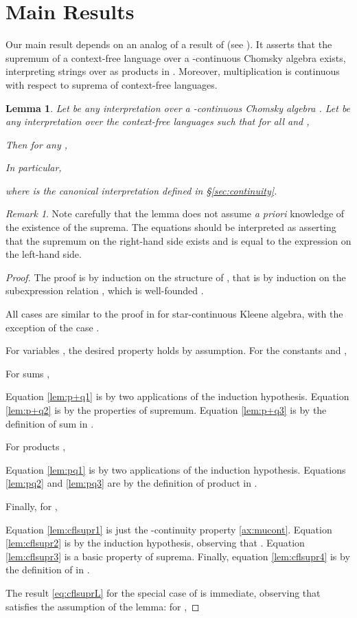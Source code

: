 \documentclass[copyright,creativecommons]{eptcs}
\newtheorem{lemma}[theorem]{Lemma}
\theoremstyle{remark}
\newtheorem{remark}{Remark}
\begin{document}
\section{Main Results}
\label{sec:main}

Our main result depends on an analog of a result of \cite{kozen81} (see \cite{K91a}). It asserts that the supremum of a context-free language over a -continuous Chomsky algebra  exists, interpreting strings over  as products in . Moreover, multiplication is continuous with respect to suprema of context-free languages.


\begin{lemma}
\label{lem:cflsupr}
Let  be any interpretation over a -continuous Chomsky algebra .
Let  be any interpretation over the context-free languages  such that for all  and ,

Then for any ,

In particular,

where  is the canonical interpretation defined in \S\ref{sec:continuity}.
\end{lemma}
\begin{remark}
Note carefully that the lemma does not assume \emph{a priori} knowledge of the existence of the suprema. The equations should be interpreted as asserting that the supremum on the right-hand side exists and is equal to the expression on the left-hand side.
\end{remark}
\begin{proof}
The proof is by induction on the structure of , that is by
induction on the subexpression relation , which is 
well-founded \cite{kozen83}.

All cases are similar to the proof in \cite[Lemma 7.1]{K91a} for star-continuous Kleene algebra, with the exception of the case .

For variables , the desired property holds by assumption. For the constants  and ,


For sums ,

Equation \eqref{lem:p+q1} is by two applications of the induction hypothesis.
Equation \eqref{lem:p+q2} is by the properties of supremum. 
Equation \eqref{lem:p+q3} is by the definition of sum in . 

For products ,

Equation \eqref{lem:pq1} is by two applications of the induction hypothesis.
Equations \eqref{lem:pq2} and \eqref{lem:pq3} are by the definition of product in . 

Finally, for ,

Equation \eqref{lem:cflsupr1} is just the -continuity property \eqref{ax:mucont}.
Equation \eqref{lem:cflsupr2} is by the induction hypothesis, observing that . 
Equation \eqref{lem:cflsupr3} is a basic property of suprema. 
Finally, equation \eqref{lem:cflsupr4} is by the definition of  in .

The result \eqref{eq:cflsuprL} for the special case of  is immediate, observing that  satisfies the assumption of the lemma: for ,

\end{proof}
\end{document}

